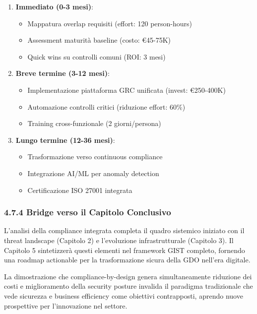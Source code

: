 \documentclass{report}
\begin{document}
\begin{enumerate}
\def\labelenumi{\arabic{enumi}.}
\tightlist
\item
  \textbf{Immediato (0-3 mesi)}:

  \begin{itemize}
  \tightlist
  \item
    Mappatura overlap requisiti (effort: 120 person-hours)
  \item
    Assessment maturità baseline (costo: €45-75K)
  \item
    Quick wins su controlli comuni (ROI: 3 mesi)
  \end{itemize}
\item
  \textbf{Breve termine (3-12 mesi)}:

  \begin{itemize}
  \tightlist
  \item
    Implementazione piattaforma GRC unificata (invest: €250-400K)
  \item
    Automazione controlli critici (riduzione effort: 60\%)
  \item
    Training cross-funzionale (2 giorni/persona)
  \end{itemize}
\item
  \textbf{Lungo termine (12-36 mesi)}:

  \begin{itemize}
  \tightlist
  \item
    Trasformazione verso continuous compliance
  \item
    Integrazione AI/ML per anomaly detection
  \item
    Certificazione ISO 27001 integrata
  \end{itemize}
\end{enumerate}

\subsubsection{4.7.4 Bridge verso il Capitolo
Conclusivo}\label{bridge-verso-il-capitolo-conclusivo}

L'analisi della compliance integrata completa il quadro sistemico
iniziato con il threat landscape (Capitolo 2) e l'evoluzione
infrastrutturale (Capitolo 3). Il Capitolo 5 sintetizzerà questi
elementi nel framework GIST completo, fornendo una roadmap actionable
per la trasformazione sicura della GDO nell'era digitale.

La dimostrazione che compliance-by-design genera simultaneamente
riduzione dei costi e miglioramento della security posture invalida il
paradigma tradizionale che vede sicurezza e business efficiency come
obiettivi contrapposti, aprendo nuove prospettive per l'innovazione nel
settore.
\end{document}
